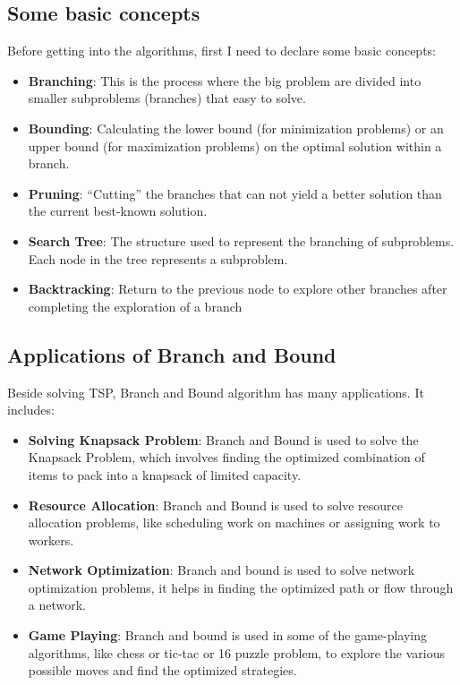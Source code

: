\documentclass[a4paper]{article}
\begin{document}
\subsection{Some basic concepts}
Before getting into the algorithms, first I need to declare some basic concepts:
\begin{itemize}
    \item \textbf{Branching}: This is the process where the big problem are divided into smaller subproblems (branches) that easy to solve.
    \item \textbf{Bounding}: Calculating the lower bound (for minimization problems) or an upper bound (for maximization problems) on the optimal solution within a branch.
    \item \textbf{Pruning}: ``Cutting'' the branches that can not yield a better solution than the current best-known solution.
    \item \textbf{Search Tree}: The structure used to represent the branching of subproblems. Each node in the tree represents a subproblem.
    \item \textbf{Backtracking}: Return to the previous node to explore other branches after completing the exploration of a branch 
\end{itemize}
\subsection{Applications of Branch and Bound}
Beside solving TSP, Branch and Bound algorithm has many applications. It includes:
\begin{itemize}
    \item \textbf{Solving Knapsack Problem}: Branch and Bound is used to solve the Knapsack Problem, which involves finding the optimized combination of items to pack into a knapsack of limited capacity.
    \item \textbf{Resource Allocation}: Branch and Bound is used to solve resource allocation problems, like scheduling work on machines or assigning work to workers. 
    \item \textbf{Network Optimization}: Branch and bound is used to solve network optimization problems, it helps in finding the optimized path or flow through a network.
    \item \textbf{Game Playing}: Branch and bound is used in some of the game-playing algorithms, like chess or tic-tac or 16 puzzle problem, to explore the various possible moves and find the optimized strategies.
\end{itemize}
\end{document}
